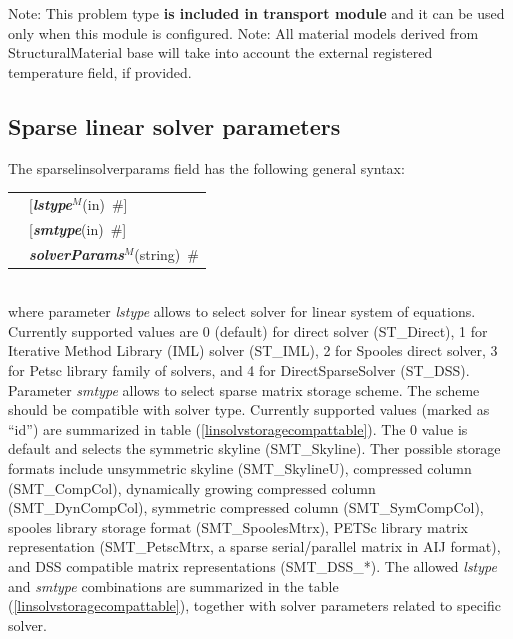 \documentclass[a4paper]{article}
\makeatletter
\newcommand{\param}[1]{{\em #1}}
\newcommand{\keywordnotype}[1]{\mbox{{\it{\bf{#1}}}}}
\newcommand{\keyword}[2]{\mbox{{\keywordnotype{#1}\tiny (#2)}}}
\newcommand{\field}[2]{\mbox{\keyword{#1}{#2}~\#}}
\newcommand{\optField}[2]{\mbox{[\field{#1}{#2}]}}
\newenvironment{record}[1][]{\begin{tabular}{|ll}}{\end{tabular}\\}
\newcommand{\recentry}[2]{{#1}&{#2}\\}
\newcounter{rcc}
\newenvironment{record}[1][\textwidth]{\setcounter{rcc}{0}\begin{tabular*}{#1}{|ll@{\extracolsep{\fill}}r}}{\end{tabular*}\\}
\newcommand{\recentry}[2]{\ifthenelse{\value{rcc}>0}{&$\backslash$ \\}{\setcounter{rcc}{1}}{#1}&{#2}}
\makeatother
\begin{document}
Note: This problem type {\bf is included in transport module} and it
can be used only when this module is configured.
Note: All material models derived from StructuralMaterial base will
take into account the external registered temperature field, if
provided.

\subsection{Sparse linear solver parameters}
\label{sparselinsolver}
The sparselinsolverparams field has the following general syntax:\\
\begin{record}
\recentry{\hspace{20mm}}{\optField{lstype$^M$}{in}} \recentry{}{\optField{smtype}{in}} \recentry{}{\field{solverParams$^M$}{string}}
\end{record}
where parameter \param{lstype} allows to select solver for linear system of
equations. Currently supported values are 0 (default) for direct solver
(ST\_Direct), 1 for Iterative Method Library (IML) solver (ST\_IML),
2 for Spooles direct solver, 3 for Petsc
library family of solvers, and 4 for DirectSparseSolver (ST\_DSS).
Parameter \param{smtype} allows to select sparse matrix storage
scheme. The scheme should be compatible with solver type.
Currently supported values (marked as ``id'') are summarized in table
(\ref{linsolvstoragecompattable}). The 0 value is default and selects
the symmetric skyline (SMT\_Skyline). Ther possible storage formats
include unsymmetric skyline (SMT\_SkylineU),
compressed column (SMT\_CompCol), dynamically growing compressed
column (SMT\_DynCompCol), symmetric compressed column
(SMT\_SymCompCol), spooles library storage format (SMT\_SpoolesMtrx),
PETSc library matrix representation (SMT\_PetscMtrx, a sparse
serial/parallel matrix in AIJ format), and DSS compatible matrix
representations (SMT\_DSS\_*).
The allowed \param{lstype} and \param{smtype} combinations are
summarized in the table (\ref{linsolvstoragecompattable}), together
with solver parameters related to specific solver.
\end{document}
